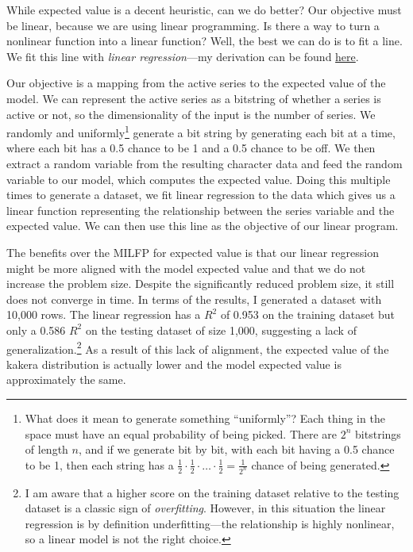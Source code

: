 \documentclass[11pt, oneside]{article}
\theoremstyle{plain}
\theoremstyle{definition}
\begin{document}
While expected value is a decent heuristic, can we do better? Our objective must
be linear, because we are using linear programming. Is there a way to turn a nonlinear
function into a linear function? Well, the best we can do is to fit a line. We fit
this line with \textit{linear regression}---my derivation can be found 
\href{https://activities.tjhsst.edu/computervision/lectures/Tensor_Calculus.pdf}{here}. 

Our objective is a mapping from the active series to the expected value of
the model. We can represent the active series as a bitstring of whether a
series is active or not, so the dimensionality of the input is the number
of series. We randomly and uniformly\footnote{What does it mean to generate
something \enquote{uniformly}? Each thing in the space must have an equal
probability of being picked. There are \( 2^n \) bitstrings of length \(
n \), and if we generate bit by bit, with each bit having a 0.5 chance to
be 1, then each string has a \( \frac{1}{2} \cdot \frac{1}{2} \cdot \ldots
\cdot \frac{1}{2} = \frac{1}{2^n} \) chance of being generated.} generate a
bit string by generating each bit at a time, where each bit has a 0.5 chance
to be 1 and a 0.5 chance to be off. We then extract a random variable from
the resulting character data and feed the random variable to our model,
which computes the expected value. Doing this multiple times to generate a
dataset, we fit linear regression to the data which gives us a linear function
representing the relationship between the series variable and the expected
value. We can then use this line as the objective of our linear program.

The benefits over the MILFP for expected value is that our linear regression
might be more aligned with the model expected value and that we do not increase
the problem size. Despite the significantly reduced problem size, it still
does not converge in time. In terms of the results, I generated a dataset with
10,000 rows. The linear regression has a \( R^2 \) of 0.953 on the training
dataset but only a 0.586 \( R^2 \) on the testing dataset of size 1,000,
suggesting a lack of generalization.\footnote{I am aware that a higher score
on the training dataset relative to the testing dataset is a classic sign of
\textit{overfitting}. However, in this situation the linear regression is by
definition underfitting---the relationship is highly nonlinear, so a linear
model is not the right choice.} As a result of this lack of alignment, the
expected value of the kakera distribution is actually lower and the model
expected value is approximately the same.
\end{document}

